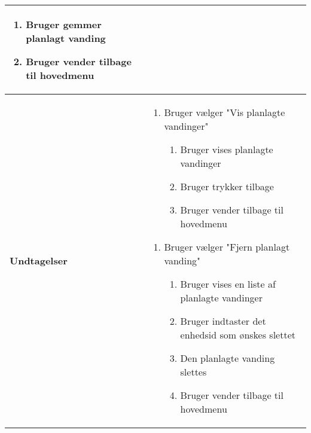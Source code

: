 \begin{center}
\begin{longtable}{|p{5cm}|p{9cm}|}
\begin{enumerate}
				\item Bruger gemmer planlagt vanding
				
				\item Bruger vender tilbage til hovedmenu
	
			\end{enumerate}\\\hline
		\textbf{Undtagelser}					
			&\begin{enumerate}[label=\ref{uc3valg}a.]
			\item Bruger vælger "Vis planlagte vandinger"
			
					\begin{enumerate}
						\item Bruger vises planlagte vandinger 
						\item Bruger trykker tilbage
						\item Bruger vender tilbage til hovedmenu	
					\end{enumerate}
					
			\end{enumerate}
			\begin{enumerate}[label=\ref{uc3valg}b.]
			\item Bruger vælger "Fjern planlagt vanding"
			
					\begin{enumerate}
						\item Bruger vises en liste af planlagte vandinger
						\item Bruger indtaster det enhedsid som ønskes slettet
						\item Den planlagte vanding slettes	
						\item Bruger vender tilbage til hovedmenu
					\end{enumerate}
					
			\end{enumerate} \\\hline
	\end{longtable}
\end{center}


